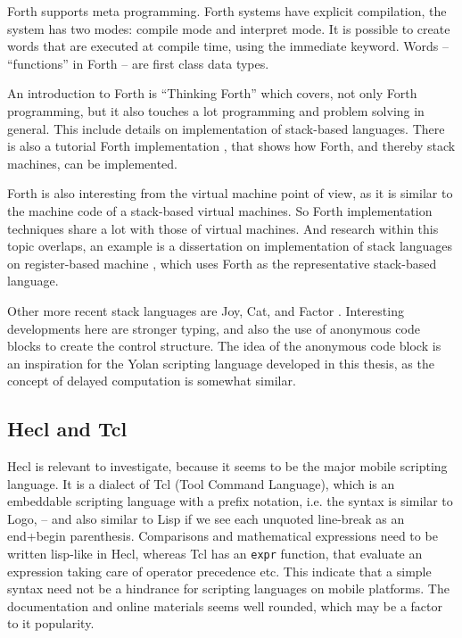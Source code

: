 \documentclass[11pt]{report}
\begin{document}
Forth supports meta programming.
Forth systems have explicit compilation, the system has two modes: compile mode and interpret mode. 
It is possible to create words that are executed at compile time, using the immediate keyword.
Words -- ``functions'' in Forth -- are first class data types.

An introduction to Forth is
``Thinking Forth'' \cite{thinking-forth} which covers, not only Forth programming, but it also touches a lot programming and problem solving in general. This include details on implementation of stack-based languages.
There is also a tutorial Forth implementation \cite{jonesforth}, that shows how Forth, and thereby stack machines, can be implemented. 

Forth is also interesting from the virtual machine point of view, as it is similar to the machine code of a stack-based virtual machines. So Forth implementation techniques share a lot with those of virtual machines. And research within this topic overlaps, an example is a dissertation on implementation of stack languages on register-based machine \cite{ertl-dissertation}, which uses Forth as the representative stack-based language.

Other more recent stack languages are Joy, Cat, and Factor \cite{factor-language}.
Interesting developments here are stronger typing, and also the use of anonymous code blocks to create the control structure.
The idea of the anonymous code block is an inspiration for the Yolan scripting language developed in this thesis, as the concept of delayed computation is somewhat similar.


\subsection{Hecl and Tcl}
Hecl is relevant to investigate, because it seems to be the major mobile scripting language. 
It is a dialect of Tcl (Tool Command Language), which is an embeddable scripting language \cite{tclbook} with a prefix notation, i.e. the syntax is similar to Logo, -- and also similar to Lisp if we see each unquoted line-break as an end+begin parenthesis.
Comparisons and mathematical expressions need to be written lisp-like in Hecl, whereas Tcl has an \verb|expr| function, that evaluate an expression taking care of operator precedence etc.
This indicate that a simple syntax need not be a hindrance for scripting languages on mobile platforms.
The documentation and online materials seems well rounded, which may be a factor to it popularity.
\end{document}
